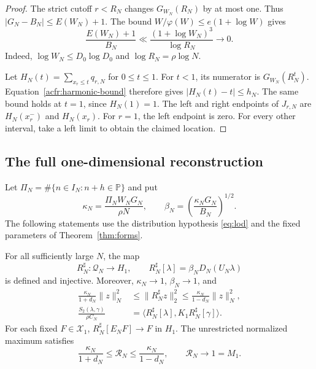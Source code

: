 \begin{proof}
The strict cutoff $r<R_N$ changes $G_{W_N}(R_N)$ by at most one.
Thus $|G_N-B_N|\leq E(W_N)+1$.
The bound $W/\varphi(W)\leq e(1+\log W)$ gives
\[
 \frac{E(W_N)+1}{B_N}
 \ll\frac{(1+\log W_N)^3}{\log R_N}\longrightarrow0.
\]
Indeed, $\log W_N\leq D_0\log D_0$ and $\log R_N=\rho\log N$.

Let $H_N(t)=\sum_{x_r\leq t}q_{r,N}$ for $0\leq t\leq1$.
For $t<1$, its numerator is $G_{W_N}(R_N^t)$.
Equation~\eqref{acfr:harmonic-bound} therefore gives
$|H_N(t)-t|\leq h_N$.
The same bound holds at $t=1$, since $H_N(1)=1$.
The left and right endpoints of $J_{r,N}$ are $H_N(x_r^-)$ and $H_N(x_r)$.
For $r=1$, the left endpoint is zero.
For every other interval, take a left limit to obtain the claimed location.
\end{proof}

\subsection{The full one-dimensional reconstruction}

Let $\Pi_N=\#\{n\in I_N:n+h\in\mathbb P\}$ and put
\[
 \kappa_N=\frac{\Pi_NW_NG_N}{\rho N},\qquad
 \beta_N=\left(\frac{\kappa_NG_N}{B_N}\right)^{1/2}.
\]
The following statements use the distribution hypothesis \eqref{eq:lod}
and the fixed parameters of Theorem~\ref{thm:forms}.

\begin{theorem}
\label{acfr:full-one}
For all sufficiently large $N$, the map
\begin{equation}\label{acfr:reconstruction}
 R_N^\sharp:\mathcal Q_N\longrightarrow H_1,\qquad
 R_N^\sharp[\lambda]=\beta_N D_N(U_N\lambda)
\end{equation}
is defined and injective.  Moreover, $\kappa_N\to1$, $\beta_N\to1$, and
\begin{align}
 \frac{\kappa_N}{1+d_N}\|z\|_N^2
 &\leq\|R_N^\sharp z\|_2^2
 \leq\frac{\kappa_N}{1-d_N}\|z\|_N^2,
                                      \label{acfr:norm-control}\\
 \frac{S_2(\lambda,\gamma)}{\rho C_N}
 &=\langle R_N^\sharp[\lambda],K_1R_N^\sharp[\gamma]\rangle.
                                      \label{acfr:full-prime}
\end{align}
For each fixed $F\in\mathcal X_1$,
$R_N^\sharp[E_NF]\to F$ in $H_1$.
The unrestricted normalized maximum satisfies
\begin{equation}\label{acfr:full-maximum}
 \frac{\kappa_N}{1+d_N}\leq\mathcal R_N
       \leq\frac{\kappa_N}{1-d_N},\qquad
 \mathcal R_N\longrightarrow1=M_1.
\end{equation}
\end{theorem}

